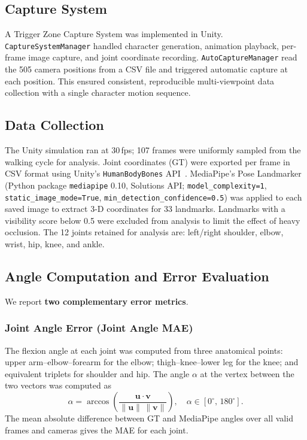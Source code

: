 \documentclass[english,fleqn]{ieej-e}
\begin{document}
\subsection{Capture System}

A Trigger Zone Capture System was implemented in Unity.
\texttt{CaptureSystemManager} handled character generation, animation
playback, per-frame image capture, and joint coordinate recording.
\texttt{AutoCaptureManager} read the 505 camera positions from a CSV file
and triggered automatic capture at each position. This ensured consistent,
reproducible multi-viewpoint data collection with a single character motion
sequence.

\subsection{Data Collection}

The Unity simulation ran at 30\,fps; 107 frames were uniformly sampled from
the walking cycle for analysis.
Joint coordinates (GT) were exported per frame in CSV format using Unity's
\texttt{HumanBodyBones} API~\cite{unity}.
MediaPipe's Pose Landmarker (Python package \texttt{mediapipe} 0.10,
Solutions API; \texttt{model\_complexity=1},
\texttt{static\_image\_mode=True},
\texttt{min\_detection\_confidence=0.5}) was applied to each saved image to
extract 3-D coordinates for 33 landmarks. Landmarks with a visibility score
below 0.5 were excluded from analysis to limit the effect of heavy
occlusion. The 12 joints retained for analysis are: left/right shoulder,
elbow, wrist, hip, knee, and ankle.

\subsection{Angle Computation and Error Evaluation}

We report \textbf{two complementary error metrics}.

\subsubsection{Joint Angle Error (Joint Angle MAE)}

The flexion angle at each joint was computed from three anatomical points:
upper arm--elbow--forearm for the elbow; thigh--knee--lower leg for the knee;
and equivalent triplets for shoulder and hip. The angle $\alpha$ at the
vertex between the two vectors was computed as
\begin{equation}
  \alpha = \arccos\!\left(\frac{\mathbf{u}\cdot\mathbf{v}}
                               {\|\mathbf{u}\|\,\|\mathbf{v}\|}\right),
  \quad \alpha \in [0^{\circ},\,180^{\circ}].
  \label{eq:joint_angle}
\end{equation}
The mean absolute difference between GT and MediaPipe angles over all valid
frames and cameras gives the MAE for each joint.
\end{document}
